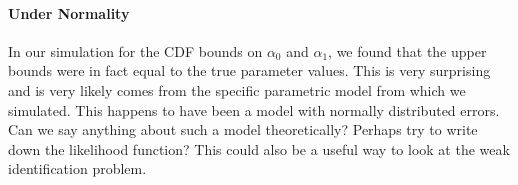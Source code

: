 \documentclass[12pt]{article}
\begin{document}
\paragraph{Under Normality}
  In our simulation for the CDF bounds on $\alpha_0$ and $\alpha_1$, we found that the upper bounds were in fact equal to the true parameter values.
  This is very surprising and is very likely comes from the specific parametric model from which we simulated.
  This happens to have been a model with normally distributed errors.
  Can we say anything about such a model theoretically?
  Perhaps try to write down the likelihood function?
  This could also be a useful way to look at the weak identification problem.
\end{document}
